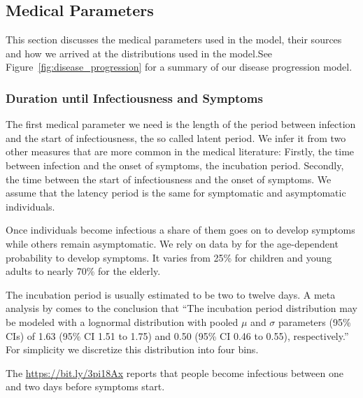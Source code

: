 \subsection{Medical Parameters}

This section discusses the medical parameters used in the model, their sources and how we
arrived at the distributions used in the model.\footnotemark See
Figure~\ref{fig:disease_progression} for a summary of our disease progression model.


\subsubsection{Duration until Infectiousness and Symptoms}

The first medical parameter we need is the length of the period between infection and
the start of infectiousness, the so called latent period.
We infer it from two other measures that are more common in the medical literature:
Firstly, the time between infection and the onset of symptoms, the incubation period.
Secondly, the time between the start of infectiousness and the onset of symptoms.
We assume that the latency period is the same for symptomatic and asymptomatic individuals.

Once individuals become infectious a share of them goes on to develop symptoms while
others remain asymptomatic.
We rely on data by \cite{Davies2020} for the age-dependent probability to develop
symptoms. It varies from 25\% for children and young adults to nearly 70\% for the
elderly.

The incubation period is usually estimated to be two to twelve days.
A meta analysis by \citet{McAloon2020} comes to the conclusion that
``The incubation period distribution may be modeled with a lognormal distribution with
pooled $\mu$ and $\sigma$ parameters (95\% CIs) of 1.63 (95\% CI 1.51 to 1.75) and 0.50
(95\% CI 0.46 to 0.55), respectively.''
For simplicity we discretize this distribution into four bins.

The \href{European Centre for Disease Prevention and Control}{https://bit.ly/3pi18Ax}
reports that people become infectious between one and two days before symptoms start.\footnotemark

